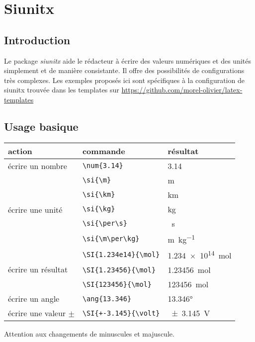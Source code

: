 \section{Siunitx}
\subsection{Introduction}
Le package \emph{siunitx} aide le rédacteur à écrire des valeurs numériques et des unités simplement et de manière consistante.
Il offre des possibilités de configurations très complexes.
Les exemples proposés ici sont spécifiques à la configuration de siunitx trouvée dans les templates sur \url{https://github.com/morel-olivier/latex-templates}

\subsection{Usage basique}
\begin{tabularx}{0.8\textwidth}{ l l l }
	\hline
	action	& commande	& résultat	\\
	\hline
	écrire un nombre	& \verb|\num{3.14}|	& \num{3.14}	\\
	\hline
	\multirow{5}{40mm}{écrire une unité}	& \verb|\si{\m}|		& \si{\m}\\
											& \verb|\si{\km}|		& \si{\km}\\
											& \verb|\si{\kg}|		& \si{\kg}\\
											& \verb|\si{\per\s}|	& \si{\per\s}\\
											& \verb|\si{\m\per\kg}|	& \si{\m\per\kg}\\
	\hline
	\multirow{3}{40mm}{écrire un résultat}	& \verb|\SI{1.234e14}{\mol}|		& \SI{1.234e14}{\mol}\\
											& \verb|\SI{1.23456}{\mol}|		& \SI{1.23456}{\mol}\\
											& \verb|\SI{123456}{\mol}|		& \SI{123456}{\mol}\\
	\hline
	écrire un angle		& \verb|\ang{13.346}|	& \ang{13.346}\\
	\hline
	écrire une valeur \(\pm\) 	& \verb|\SI{+-3.145}{\volt}| & \SI{+-3.145}{\volt}	\\
	\hline
\end{tabularx}

Attention aux changements de minuscules et majuscule.

